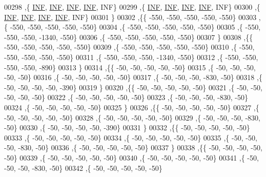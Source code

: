 \begin{DoxyCode}
00298   ,\{   \hyperlink{constants_8h_a12c2040f25d8e3a7b9e1c2024c618cb6}{INF},   \hyperlink{constants_8h_a12c2040f25d8e3a7b9e1c2024c618cb6}{INF},   \hyperlink{constants_8h_a12c2040f25d8e3a7b9e1c2024c618cb6}{INF},   \hyperlink{constants_8h_a12c2040f25d8e3a7b9e1c2024c618cb6}{INF},   INF\}
00299   ,\{   \hyperlink{constants_8h_a12c2040f25d8e3a7b9e1c2024c618cb6}{INF},   \hyperlink{constants_8h_a12c2040f25d8e3a7b9e1c2024c618cb6}{INF},   \hyperlink{constants_8h_a12c2040f25d8e3a7b9e1c2024c618cb6}{INF},   \hyperlink{constants_8h_a12c2040f25d8e3a7b9e1c2024c618cb6}{INF},   INF\}
00300   ,\{   \hyperlink{constants_8h_a12c2040f25d8e3a7b9e1c2024c618cb6}{INF},   \hyperlink{constants_8h_a12c2040f25d8e3a7b9e1c2024c618cb6}{INF},   \hyperlink{constants_8h_a12c2040f25d8e3a7b9e1c2024c618cb6}{INF},   \hyperlink{constants_8h_a12c2040f25d8e3a7b9e1c2024c618cb6}{INF},   INF\}
00301   \}
00302  ,\{\{  -550,  -550,  -550,  -550,  -550\}
00303   ,\{  -550,  -550,  -550,  -550,  -550\}
00304   ,\{  -550,  -550,  -550,  -550,  -550\}
00305   ,\{  -550,  -550,  -550, -1340,  -550\}
00306   ,\{  -550,  -550,  -550,  -550,  -550\}
00307   \}
00308  ,\{\{  -550,  -550,  -550,  -550,  -550\}
00309   ,\{  -550,  -550,  -550,  -550,  -550\}
00310   ,\{  -550,  -550,  -550,  -550,  -550\}
00311   ,\{  -550,  -550,  -550, -1340,  -550\}
00312   ,\{  -550,  -550,  -550,  -550,  -890\}
00313   \}
00314  ,\{\{   -50,   -50,   -50,   -50,   -50\}
00315   ,\{   -50,   -50,   -50,   -50,   -50\}
00316   ,\{   -50,   -50,   -50,   -50,   -50\}
00317   ,\{   -50,   -50,   -50,  -830,   -50\}
00318   ,\{   -50,   -50,   -50,   -50,  -390\}
00319   \}
00320  ,\{\{   -50,   -50,   -50,   -50,   -50\}
00321   ,\{   -50,   -50,   -50,   -50,   -50\}
00322   ,\{   -50,   -50,   -50,   -50,   -50\}
00323   ,\{   -50,   -50,   -50,  -830,   -50\}
00324   ,\{   -50,   -50,   -50,   -50,   -50\}
00325   \}
00326  ,\{\{   -50,   -50,   -50,   -50,   -50\}
00327   ,\{   -50,   -50,   -50,   -50,   -50\}
00328   ,\{   -50,   -50,   -50,   -50,   -50\}
00329   ,\{   -50,   -50,   -50,  -830,   -50\}
00330   ,\{   -50,   -50,   -50,   -50,  -390\}
00331   \}
00332  ,\{\{   -50,   -50,   -50,   -50,   -50\}
00333   ,\{   -50,   -50,   -50,   -50,   -50\}
00334   ,\{   -50,   -50,   -50,   -50,   -50\}
00335   ,\{   -50,   -50,   -50,  -830,   -50\}
00336   ,\{   -50,   -50,   -50,   -50,   -50\}
00337   \}
00338  ,\{\{   -50,   -50,   -50,   -50,   -50\}
00339   ,\{   -50,   -50,   -50,   -50,   -50\}
00340   ,\{   -50,   -50,   -50,   -50,   -50\}
00341   ,\{   -50,   -50,   -50,  -830,   -50\}
00342   ,\{   -50,   -50,   -50,   -50,   -50\}

\end{DoxyCode}
